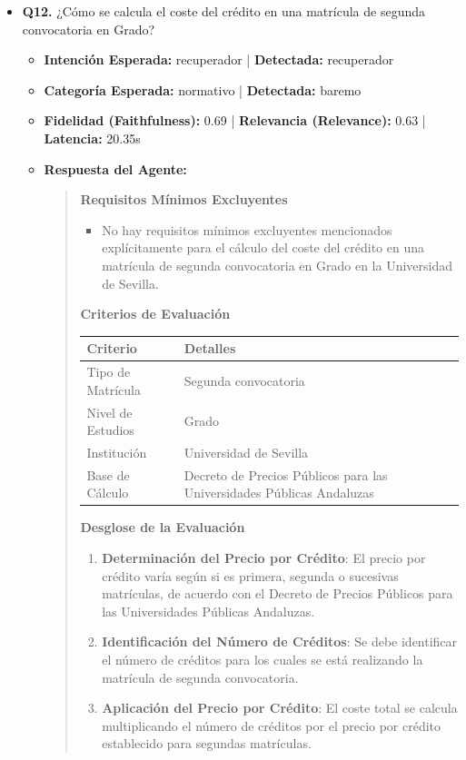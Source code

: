 \documentclass[12pt,a4paper,oneside]{report}
\begin{document}
\begin{itemize}
  
\item \textbf{Q12.} ¿Cómo se calcula el coste del crédito en una matrícula de segunda convocatoria en Grado? \\
        \begin{itemize}
          \item \textbf{Intención Esperada:} recuperador | \textbf{Detectada:} recuperador
          \item \textbf{Categoría Esperada:} normativo | \textbf{Detectada:} baremo
          \item \textbf{Fidelidad (Faithfulness):} 0.69 | \textbf{Relevancia (Relevance):} 0.63 | \textbf{Latencia:} 20.35s
          \item \textbf{{Respuesta del Agente:}} \\
                \begin{quote}

\noindent\textbf{Requisitos Mínimos Excluyentes}\\

\begin{itemize}
  \item No hay requisitos mínimos excluyentes mencionados explícitamente para el cálculo del coste del crédito en una matrícula de segunda convocatoria en Grado en la Universidad de Sevilla.
\end{itemize}


\noindent\textbf{Criterios de Evaluación}\\


\begin{tabular}{p{3.5cm} p{8cm}}
\toprule
\textbf{Criterio} & \textbf{Detalles} \\
\midrule
Tipo de Matrícula & Segunda convocatoria \\
Nivel de Estudios & Grado \\
Institución & Universidad de Sevilla \\
Base de Cálculo & Decreto de Precios Públicos para las Universidades Públicas Andaluzas \\
\bottomrule
\end{tabular}



\noindent\textbf{Desglose de la Evaluación}\\

\begin{enumerate}
  \item \textbf{Determinación del Precio por Crédito}: El precio por crédito varía según si es primera, segunda o sucesivas matrículas, de acuerdo con el Decreto de Precios Públicos para las Universidades Públicas Andaluzas.
  \item \textbf{Identificación del Número de Créditos}: Se debe identificar el número de créditos para los cuales se está realizando la matrícula de segunda convocatoria.
  \item \textbf{Aplicación del Precio por Crédito}: El coste total se calcula multiplicando el número de créditos por el precio por crédito establecido para segundas matrículas.
\end{enumerate}



\end{quote}
\end{itemize}
\end{itemize}
\end{document}

